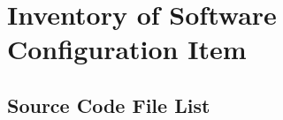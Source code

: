 
\chapter{Inventory of Software Configuration Item}

\section{Source Code File List}
\label{sec:code_list}